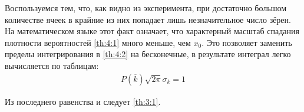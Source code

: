 Воспользуемся тем, что, как видно из эксперимента, при достаточно большом количестве ячеек в крайние из них попадает лишь незначительное число зёрен. На математическом языке этот факт означает, что характерный масштаб спадания плотности вероятностей \eqref{th:4:1} много меньше, чем $x_0$. Это позволяет заменить пределы интегрирования в \eqref{th:4:2} на бесконечные, в результате интеграл легко вычисляется по таблицам:
\begin{align}
	P(\overline{k}) \sqrt{2 \pi} \sigma_k = 1 
\end{align}

Из последнего равенства и следует \eqref{th:3:1}.